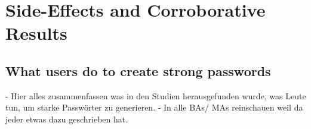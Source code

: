 \chapter[Side-Effects and Corroborative Results]{Side-Effects and Corroborative Results}\label{chap:side_effects}


\section{What users do to create strong passwords}
- Hier alles zusammenfassen was in den Studien herausgefunden wurde, 
was Leute tun, um starke Passwörter zu generieren. 
- In alle BAs/ MAs reinschauen weil da jeder etwas dazu geschrieben hat. 






